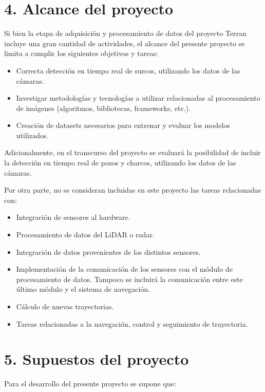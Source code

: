 \documentclass[
11pt, %
]{charter}
\begin{document}
\section{4. Alcance del proyecto}
\label{sec:alcance}

Si bien la etapa de adquisición y procesamiento de datos del proyecto Terran incluye una gran cantidad de actividades, el alcance del presente proyecto se limita a cumplir los siguientes objetivos y tareas:

\begin{itemize}
	\item Correcta detección en tiempo real de surcos, utilizando los datos de las cámaras.
	\item Investigar metodologías y tecnologías a utilizar relacionadas al procesamiento de imágenes (algoritmos, bibliotecas, frameworks, etc.).
	\item Creación de datasets necesarios para entrenar y evaluar los modelos utilizados. 
\end{itemize}

Adicionalmente, en el transcurso del proyecto se evaluará la posibilidad de incluir la detección en tiempo real de pozos y charcos, utilizando los datos de las cámaras.

Por otra parte, no se consideran incluidas en este proyecto las tareas relacionadas con:

\begin{itemize}
	\item Integración de sensores al hardware.
	\item Procesamiento de datos del LiDAR o radar.	
	\item Integración de datos provenientes de los distintos sensores.
	\item Implementación de la comunicación de los sensores con el módulo de procesamiento de datos. Tampoco se incluirá la comunicación entre este último módulo y el sistema de navegación.
	\item Cálculo de nuevas trayectorias.
	\item Tareas relacionadas a la navegación, control y seguimiento de trayectoria.
\end{itemize}

\section{5. Supuestos del proyecto}
\label{sec:supuestos}

Para el desarrollo del presente proyecto se supone que:
\end{document}
